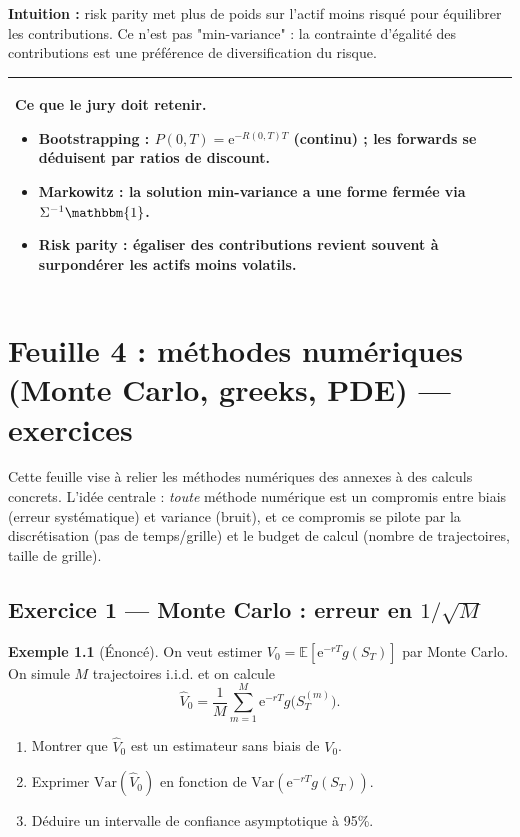 \documentclass[11pt,a4paper]{report}
\newcommand{\ee}{\mathrm{e}}
\newcommand{\E}{\mathbb{E}}
\newcommand{\Var}{\mathrm{Var}}
\newcommand{\1}{\mathbbm{1}}
\theoremstyle{definition}
\newtheorem{example}{Exemple}[chapter]
\theoremstyle{plain}
\theoremstyle{remark}
\newenvironment{jurybox}{%
  \begin{center}
  \setlength{\tabcolsep}{6pt}%
  \renewcommand{\arraystretch}{1.1}%
  \begin{tabular}{|p{0.94\textwidth}|}
  \hline
  \small\textbf{Ce que le jury doit retenir.}\par\medskip
}{%
  \\ \hline
  \end{tabular}
  \end{center}
}
\begin{document}
\textbf{Intuition :} risk parity met plus de poids sur l'actif moins risqué pour équilibrer les contributions.
Ce n'est pas "min-variance" : la contrainte d'égalité des contributions est une préférence de diversification du risque.

\begin{jurybox}
\begin{itemize}
  \item Bootstrapping : $P(0,T)=\ee^{-R(0,T)T}$ (continu) ; les forwards se déduisent par ratios de discount.
  \item Markowitz : la solution min-variance a une forme fermée via $\Sigma^{-1}\1$.
  \item Risk parity : égaliser des contributions revient souvent à surpondérer les actifs moins volatils.
\end{itemize}
\end{jurybox}

\chapter{Feuille 4 : méthodes numériques (Monte Carlo, greeks, PDE) --- exercices}
\label{chap:td4}

Cette feuille vise à relier les méthodes numériques des annexes à des calculs concrets.
L'idée centrale : \emph{toute} méthode numérique est un compromis entre biais (erreur systématique) et variance (bruit),
et ce compromis se pilote par la discrétisation (pas de temps/grille) et le budget de calcul (nombre de trajectoires, taille de grille).

\section{Exercice 1 --- Monte Carlo : erreur en $1/\sqrt{M}$}
\begin{example}[Énoncé]
On veut estimer $V_0=\E[\ee^{-rT}g(S_T)]$ par Monte Carlo.
On simule $M$ trajectoires i.i.d. et on calcule
\[\widehat{V}_0=\frac{1}{M}\sum_{m=1}^M \ee^{-rT} g\bigl(S_T^{(m)}\bigr).
\]
\begin{enumerate}[label=\alph*)]
  \item Montrer que $\widehat{V}_0$ est un estimateur sans biais de $V_0$.
  \item Exprimer $\Var(\widehat{V}_0)$ en fonction de $\Var(\ee^{-rT}g(S_T))$.
  \item Déduire un intervalle de confiance asymptotique à 95\%.
\end{enumerate}
\end{example}
\end{document}
